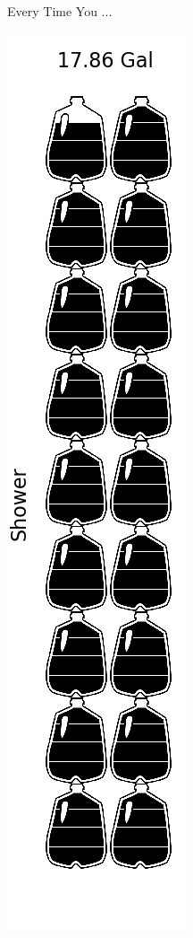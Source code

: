 \documentclass[paperwidth=11in,paperheight=8.5in,fontscale=1]{baposter} %
\begin{document}
\begin{poster}
\begin{posterbox}[column=0,row=.05,span=1,textborder=rounded,headerborder=open,height=.6,name=misc,textfont=\footnotesize, boxheaderheight=.25in]{ Every Time You ...}
\begin{minipage}[b][][b]{.24\textwidth}
\end{minipage}
\begin{minipage}[b][][b]{.24\textwidth}
		\includegraphics[width=\textwidth]{Shower_icon.png}

\end{minipage}
\end{posterbox}
\end{poster}
\end{document}
